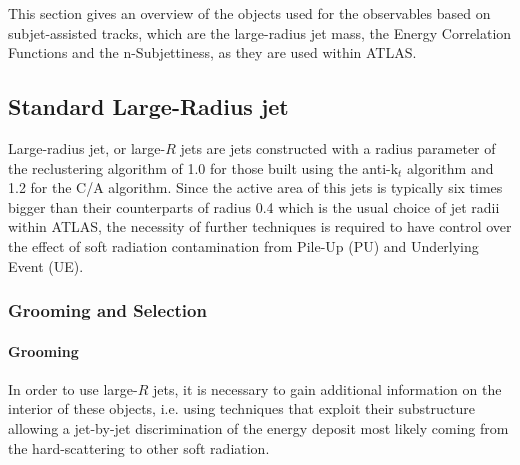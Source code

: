 This section gives an overview of the objects used for the observables based on subjet-assisted tracks, which are the large-radius jet mass, the Energy Correlation Functions and the n-Subjettiness, as they are used within ATLAS.

\subsection{Standard Large-Radius jet}




Large-radius jet, or large-$R$ jets are jets constructed with a radius parameter of the reclustering algorithm of 1.0 for those built using the anti-k$_t$ algorithm and 1.2 for the C/A algorithm.
Since the active area of this jets is typically six times bigger than their counterparts of radius 0.4 which is the usual choice of jet radii within ATLAS, the necessity of further techniques is required to have control over the effect of soft radiation contamination from Pile-Up (PU) and Underlying Event (UE).

\subsubsection{Grooming and Selection}

\paragraph{Grooming}
In order to use large-$R$ jets, it is necessary to gain additional information on the interior of these objects, i.e. using techniques that exploit their substructure allowing a jet-by-jet discrimination of the energy deposit most likely coming from the hard-scattering to other soft radiation.

